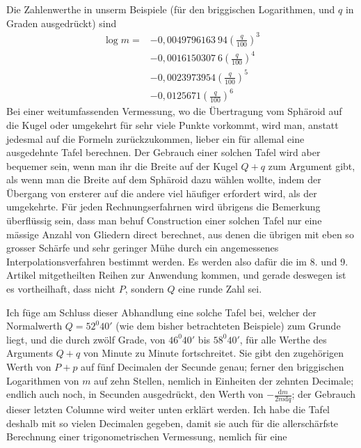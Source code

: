 \par\indent Die Zahlenwerthe in unserm Beispiele (für den briggischen Logarithmen, und \(q\) in Graden ausgedrückt) sind
\[
\begin{aligned}
\log m={}&-0{,}0049796163\ 94(\frac{q}{100})^3\\
&-0{,}0016150307\ 6(\frac{q}{100})^4\\
&-0{,}0023973954(\frac{q}{100})^5\\
&-0{,}0125671(\frac{q}{100})^6
\end{aligned}
\]
\indent Bei einer weitumfassenden Vermessung, wo die Übertragung vom Sphäroid auf die Kugel oder umgekehrt für sehr viele Punkte vorkommt, wird man, anstatt jedesmal auf die Formeln zurückzukommen, lieber ein für allemal eine ausgedehnte Tafel berechnen. Der Gebrauch einer solchen Tafel wird aber bequemer sein, wenn man ihr die Breite auf der Kugel \(Q+q\) zum Argument gibt, als wenn man die Breite auf dem Sphäroid dazu wählen wollte, indem der Übergang von ersterer auf die andere viel häufiger erfordert wird, als der umgekehrte. Für jeden Rechnungserfahrnen wird übrigens die Bemerkung überflüssig sein, dass man behuf Construction einer solchen Tafel nur eine mässige Anzahl von Gliedern direct berechnet, aus denen die übrigen mit eben so grosser Schärfe und sehr geringer Mühe durch ein angemessenes Interpolationsverfahren bestimmt werden. Es werden also dafür die im 8. und 9. Artikel mitgetheilten Reihen zur Anwendung kommen, und gerade deswegen ist es vortheilhaft, dass nicht \(P\), sondern \(Q\) eine runde Zahl sei.

Ich füge am Schluss dieser Abhandlung eine solche Tafel bei, welcher der Normalwerth \(Q=52^0 40'\) (wie dem bisher betrachteten Beispiele) zum Grunde liegt, und die durch zwölf Grade, von \(46^0 40'\) bis \(58^0 40'\), für alle Werthe des Arguments \(Q+q\) von Minute zu Minute fortschreitet. Sie gibt den zugehörigen Werth von \(P+p\) auf fünf Decimalen der Secunde genau; ferner den briggischen Logarithmen von \(m\) auf zehn Stellen, nemlich in Einheiten der zehnten Decimale; endlich auch noch, in Secunden ausgedrückt, den Werth von \(-\tfrac{\mathrm{d}m}{2m\mathrm{d}q}\); der Gebrauch dieser letzten Columne wird weiter unten erklärt werden. Ich habe die Tafel deshalb mit so vielen Decimalen gegeben, damit sie auch für die allerschärfste Berechnung einer trigonometrischen Vermessung, nemlich für eine
